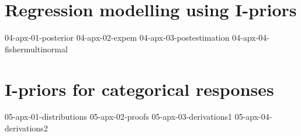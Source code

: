 \documentclass[a4paper,showframe,11pt]{report}
\begin{document}
\appendix
\chapter{Regression modelling using I-priors}
{04-apx-01-posterior}
{04-apx-02-expem}
{04-apx-03-postestimation}
{04-apx-04-fishermultinormal}

\chapter{I-priors for categorical responses}
{05-apx-01-distributions}
{05-apx-02-proofs}
{05-apx-03-derivations1}
{05-apx-04-derivations2}


\printindex
\end{document}
